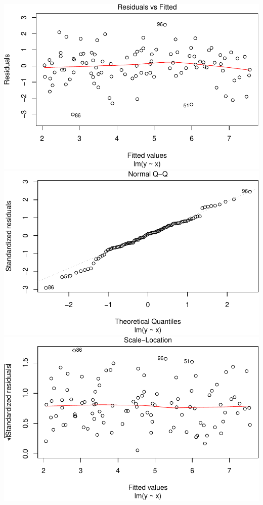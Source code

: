 \documentclass[]{article}
\begin{document}
\includegraphics{./unnamed-chunk-23-1.pdf}
\includegraphics{./unnamed-chunk-23-2.pdf}
\includegraphics{./unnamed-chunk-23-3.pdf}
\end{document}
